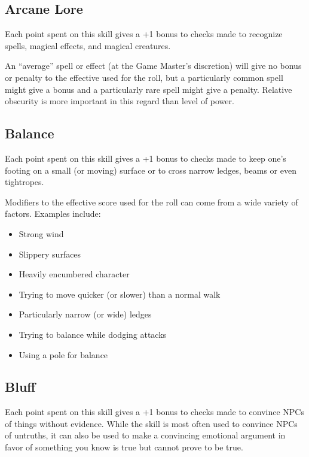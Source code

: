 \begin{multicols*}{2}
\subsection{Arcane Lore}\label{skill:Arcane Lore}
Each point spent on this skill gives a +1 bonus to  checks made to recognize spells, magical effects, and magical creatures.

An “average” spell or effect (at the Game Master’s discretion) will give no bonus or penalty to the effective  used for the roll, but a particularly common spell might give a bonus and a particularly rare spell might give a penalty. Relative obscurity is more important in this regard than level of power.


\subsection{Balance}\label{skill:Balance}
Each point spent on this skill gives a +1 bonus to  checks made to keep one’s footing on a small (or moving) surface or to cross narrow ledges, beams or even tightropes.

Modifiers to the effective  score used for the roll can come from a wide variety of factors. Examples include:

\begin{itemize}
	\item{Strong wind}
	\item{Slippery surfaces}
	\item{Heavily encumbered character}
	\item{Trying to move quicker (or slower) than a normal walk}
	\item{Particularly narrow (or wide) ledges}
	\item{Trying to balance while dodging attacks}
	\item{Using a pole for balance}
\end{itemize}

\subsection{Bluff}\label{skill:Bluff}
Each point spent on this skill gives a +1 bonus to  checks made to convince NPCs of things without evidence. While the skill is most often used to convince NPCs of untruths, it can also be used to make a convincing emotional argument in favor of something you know is true but cannot prove to be true.


\end{multicols*}
